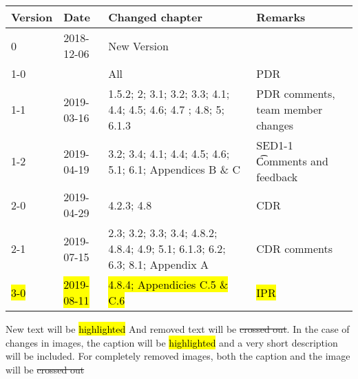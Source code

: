 \begin{longtable}{|p{1.5cm}|p{2cm}|p{6cm}|p{3cm}|}\hline
\centering
\textbf{Version} & \textbf{Date} & \textbf{Changed chapter} & \textbf{Remarks}  \\\hline
0       & 2018-12-06        & New Version                                                                   &                                       \\\hline
1-0     &                   & All                                                                           & PDR                                   \\\hline
1-1     & 2019-03-16        & 1.5.2; 2; 3.1; 3.2; 3.3; 4.1; 4.4; 4.5; 4.6; 4.7 ; 4.8; 5; 6.1.3              & PDR comments, team member changes     \\\hline
1-2     & 2019-04-19        & 3.2; 3.4; 4.1; 4.4; 4.5; 4.6; 5.1; 6.1; Appendices B \& C                     & SED1-1 \t Comments and feedback       \\\hline
2-0     & 2019-04-29        & 4.2.3; 4.8                                                                    & CDR                                   \\\hline
2-1     & 2019-07-15        & 2.3; 3.2; 3.3; 3.4; 4.8.2; 4.8.4; 4.9; 5.1; 6.1.3; 6.2; 6.3; 8.1; Appendix A  & CDR comments                          \\\hline
\hl{3-0}& \hl{2019-08-11}   & \hl{4.8.4; Appendicies C.5 \& C.6}                                                                         & \hl{IPR}                              \\\hline
\end{longtable}       

New text will be \hl{highlighted} And removed text will be \st{crossed out}. In the case of changes in images, the caption will be \hl{highlighted} and a very short description will be included. For completely removed images, both the caption and the image will be \st{crossed out} 
